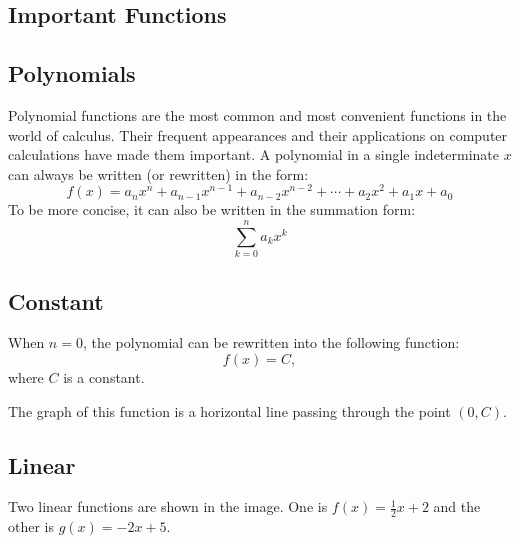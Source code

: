 \subsection{Important Functions}
\label{sss:impo-1cf2}

\subsection{Polynomials}
\label{sss:poly-f9e4}

Polynomial functions are the most common and most convenient functions in the world of calculus. Their frequent appearances and their applications on computer calculations have made them important. A polynomial in a single indeterminate $x$ can always be written (or rewritten) in the form:
\[
f(x) = a_n x^n + a_{n-1} x^{n-1} + a_{n-2} x^{n-2} + \cdots + a_2 x^2 + a_1 x + a_0
\]
To be more concise, it can also be written in the summation form:
\[
\sum_{k=0}^n a_k x^k
\]

\subsection{Constant}
\label{sss:cons-617a}

When $n = 0$, the polynomial can be rewritten into the following function:
\[
f(x) = C,
\]
where $C$ is a constant.

The graph of this function is a horizontal line passing through the point $(0, C)$.

\subsection{Linear}
\label{sss:line-9a93}

Two linear functions are shown in the image. One is $f(x) = \frac{1}{2}x + 2$ and the other is $g(x) = -2x + 5$. 


